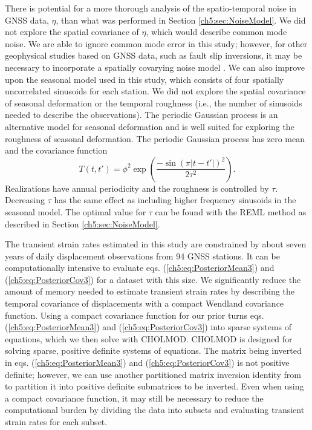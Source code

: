 There is potential for a more thorough analysis of the spatio-temporal noise in GNSS data, $\eta$, than what was performed in Section \ref{ch5:sec:NoiseModel}. We did not explore the spatial covariance of $\eta$, which would describe common mode noise. We are able to ignore common mode error in this study; however, for other geophysical studies based on GNSS data, such as fault slip inversions, it may be necessary to incorporate a spatially covarying noise model \citep[e.g.,][]{Miyazaki2003}. We can also improve upon the seasonal model used in this study, which consists of four spatially uncorrelated sinusoids for each station. We did not explore the spatial covariance of seasonal deformation or the temporal roughness (i.e., the number of sinusoids needed to describe the observations). The periodic Gaussian process \citep{Mackay1998} is an alternative model for seasonal deformation and is well suited for exploring the roughness of seasonal deformation.  The periodic Gaussian process has zero mean and the covariance function
\begin{equation}\label{ch5:eq:Periodic}
T(t,t') = \phi^2 \exp\left(\frac{-\sin(\pi|t - t'|)^2}{2\tau^2}\right).
\end{equation}
Realizations have annual periodicity and the roughness is controlled by $\tau$. Decreasing $\tau$ has the same effect as including higher frequency sinusoids in the seasonal model. The optimal value for $\tau$ can be found with the REML method as described in Section \ref{ch5:sec:NoiseModel}. 

The transient strain rates estimated in this study are constrained by about seven years of daily displacement observations from 94 GNSS stations. It can be computationally intensive to evaluate eqs. (\ref{ch5:eq:PosteriorMean3}) and (\ref{ch5:eq:PosteriorCov3}) for a dataset with this size. We significantly reduce the amount of memory needed to estimate transient strain rates by describing the temporal covariance of displacements with a compact Wendland covariance function. Using a compact covariance function for our prior turns eqs. (\ref{ch5:eq:PosteriorMean3}) and (\ref{ch5:eq:PosteriorCov3}) into sparse systems of equations, which we then solve with CHOLMOD. CHOLMOD is designed for solving sparse, positive definite systems of equations. The matrix being inverted in eqs. (\ref{ch5:eq:PosteriorMean3}) and (\ref{ch5:eq:PosteriorCov3}) is not positive definite; however, we can use another partitioned matrix inversion identity from \citet{Press2007} to partition it into positive definite submatrices to be inverted. Even when using a compact covariance function, it may still be necessary to reduce the computational burden by dividing the data into subsets and evaluating transient strain rates for each subset.   

